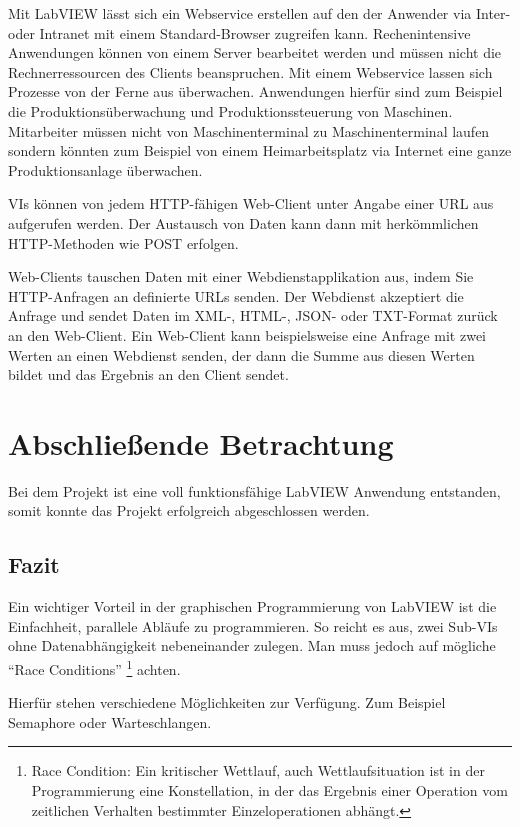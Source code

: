 Mit LabVIEW lässt sich ein Webservice erstellen auf den der Anwender via Inter- oder Intranet mit einem Standard-Browser zugreifen kann. 
Rechenintensive Anwendungen können von einem Server  bearbeitet werden und müssen nicht die Rechnerressourcen des Clients beanspruchen. 
Mit einem Webservice lassen sich Prozesse von der Ferne aus überwachen. Anwendungen hierfür sind zum Beispiel die Produktionsüberwachung und Produktionssteuerung von Maschinen. Mitarbeiter müssen nicht von Maschinenterminal zu Maschinenterminal laufen sondern könnten zum Beispiel von einem Heimarbeitsplatz via Internet eine ganze Produktionsanlage überwachen.

VIs können von jedem HTTP-fähigen Web-Client unter Angabe einer URL aus aufgerufen werden. Der Austausch von Daten kann dann mit herkömmlichen HTTP-Methoden wie POST erfolgen. 

Web-Clients tauschen Daten mit einer Webdienstapplikation aus, indem Sie HTTP-Anfragen an definierte URLs senden. Der Webdienst akzeptiert die Anfrage und sendet Daten im XML-, HTML-, JSON- oder TXT-Format zurück an den Web-Client. Ein Web-Client kann beispielsweise eine Anfrage mit zwei Werten an einen Webdienst senden, der dann die Summe aus diesen Werten bildet und das Ergebnis an den Client sendet. \cite{LabViewHilfe}





\section{Abschließende Betrachtung}
Bei dem Projekt ist eine voll funktionsfähige LabVIEW Anwendung entstanden, somit konnte das Projekt erfolgreich abgeschlossen werden. 

\subsection{Fazit}
Ein wichtiger Vorteil in der graphischen Programmierung von LabVIEW ist die Einfachheit, parallele Abläufe zu programmieren. 
So reicht es aus, zwei Sub-VIs ohne Datenabhängigkeit nebeneinander zulegen. 
Man muss jedoch auf mögliche "`Race Conditions"'
	\footnote{Race Condition: Ein kritischer Wettlauf, auch Wettlaufsituation ist 	in der Programmierung eine Konstellation, in der das Ergebnis einer Operation vom zeitlichen Verhalten bestimmter Einzeloperationen abhängt.\cite{wiki-RC} } 
achten.



Hierfür stehen verschiedene Möglichkeiten zur Verfügung. 
Zum Beispiel Semaphore oder Warteschlangen. 

